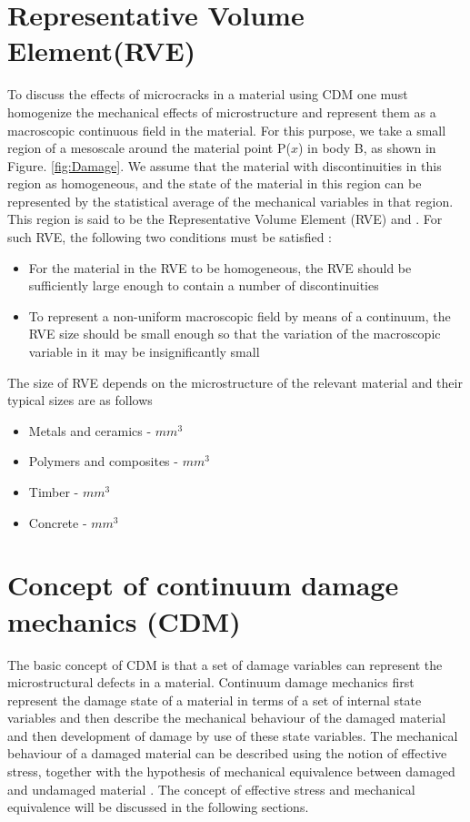 \documentclass[12pt,openright,twoside]{report}
\begin{document}
\section{Representative Volume Element(RVE)}
\indent\indent\indent  To discuss the effects of microcracks in a material using CDM one must homogenize the mechanical effects of microstructure and represent them as a macroscopic continuous field in the material. For this purpose, we take a small region of a mesoscale around the material point P($x$) in body B, as shown in Figure. \ref{fig:Damage}. We assume that the material with discontinuities in this region as homogeneous, and the state of the material in this region can be represented by the statistical average of the mechanical variables in that region. This region is said to be the Representative Volume Element (RVE) \citep{hill1963elastic} and \citep{hashin1983analysis}. For such RVE, the following two conditions must be satisfied \citep{murakami2012continuum}:
\begin{itemize}
\item  For the material in the RVE to be homogeneous, the RVE should be sufficiently large enough to contain a number of discontinuities
\item To represent a non-uniform macroscopic field by means of a continuum, the RVE size should be small enough so that the variation of the macroscopic variable in it may be insignificantly small 
\end{itemize}
The size of RVE depends on the microstructure of the relevant material and their typical sizes are as follows \citep{lemaitre2012course}
\begin{itemize}
\item Metals and ceramics  \;    -    \;$mm^3$
\item Polymers and composites \;   -   \;$mm^3$
\item Timber\; - \;$mm^3$
\item Concrete \; - \;$mm^3$
\end{itemize}

\section{Concept of continuum damage mechanics (CDM)}
\indent\indent\indent The basic concept of CDM is that a set of damage variables can represent the microstructural defects in a material. Continuum damage mechanics first represent the damage state of a material in terms of a set of internal state variables and then describe the mechanical behaviour of the damaged material and then development of damage by use of these state variables. The mechanical behaviour of a damaged material can be described using the notion of effective stress, together with the hypothesis of mechanical equivalence between damaged and undamaged material \citep{murakami2012continuum}. The concept of effective stress and mechanical equivalence will be discussed in the following sections.
\end{document}
